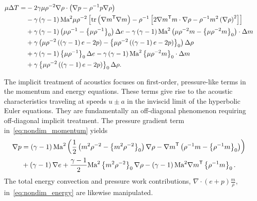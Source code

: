 \begin{align}
\mu\Delta{}T =
  &{}- 2\gamma\mu\rho^{-2}\nabla{}\rho\cdot
       \left(\nabla{}p-\rho^{-1}p\nabla\rho\right)
\notag\\
  &{}- \gamma\left(\gamma-1\right)\Mach^{2}\mu\rho^{-2}\left[
             \trace\left(\trans{\nabla{}m}\nabla{}m\right)
           - \rho^{-1}\left[
               2\trans{\nabla{}m}m\cdot\nabla{}\rho
             - \rho^{-1} m^2 \left(\nabla\rho\right)^{2}
           \right]
       \right]
\notag\\
  &{}+ \gamma\left(\gamma-1\right)\lessreference{\mu\rho^{-1}}\Delta{}e
     - \gamma\left(\gamma-1\right)\Mach^{2}
       \lessreference{\mu\rho^{-2}m}\cdot\Delta{}m
\notag\\
  &{}+ \gamma\lessreference{%
           \mu\rho^{-2}\left(\left(\gamma-1\right)e-2p\right)
       } \Delta\rho
\notag\\
  &{}+ \gamma\left(\gamma-1\right)\reference{\mu\rho^{-1}}\Delta{}e
     - \gamma\left(\gamma-1\right)\Mach^{2}
       \reference{\mu\rho^{-2}m}\cdot\Delta{}m
\notag\\
  &{}+ \gamma\reference{%
           \mu\rho^{-2}\left(\left(\gamma-1\right)e-2p\right)
       } \Delta\rho%
.
\label{eq:Tmonstrosity}
\end{align}

The implicit treatment of acoustics focuses on first-order, pressure-like
terms in the momentum and energy equations.  These terms give rise to the
acoustic characteristics traveling at speeds $u\pm{}a$ in the inviscid
limit of the hyperbolic Euler equations.  They are fundamentally an
off-diagonal phenomenon requiring off-diagonal implicit treatment.  The
pressure gradient term in~\eqref{eq:nondim_momentum} yields
\begin{align}
  \nabla{}p &= \left(\gamma-1\right)\mbox{Ma}_{}^{2}\left(
      \frac{1}{2} \left({m^{2}\rho^{-2}}-\left\{m^{2}\rho^{-2}\right\}_{0}\right)\nabla\rho
    - {\nabla{}m}^{\mathsf{T}}\left({\rho^{-1}m}-\left\{\rho^{-1}m\right\}_{0}\right)
  \right)
\notag\\
&+ \left(\gamma-1\right) \nabla{}e
 + \frac{\gamma-1}{2}\mbox{Ma}_{}^{2} \left\{m^{2}\rho^{-2}\right\}_{0}\nabla\rho
 - \left(\gamma-1\right)\mbox{Ma}_{}^{2} {\nabla{}m}^{\mathsf{T}}\left\{\rho^{-1}m\right\}_{0}.
 \label{eq:linearized_pressure_gradient}
\end{align}
The total energy convection and pressure work contributions,
$\nabla\cdot\left(e+p\right)\frac{m}{\rho}$, in~\eqref{eq:nondim_energy} are
likewise manipulated.

